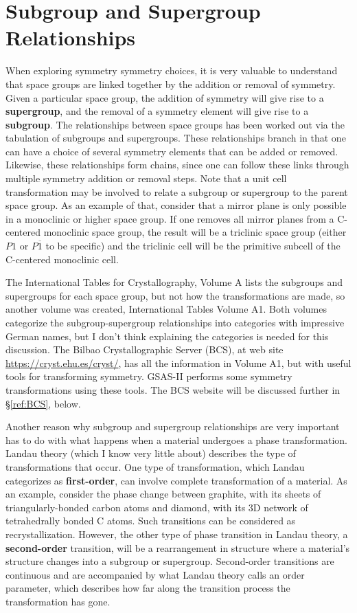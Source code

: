 \section{Subgroup and Supergroup Relationships}

When exploring symmetry symmetry choices, it is very valuable to understand that space groups are linked together by the addition or removal of symmetry. Given a particular space group, the addition of symmetry will give rise to a \textbf{supergroup}, and the removal of a symmetry element will give rise to a \textbf{subgroup}. The relationships between space groups has been worked out via the tabulation of subgroups and supergroups. These relationships branch in that one can have a choice of several symmetry elements that can be added or removed. Likewise, these relationships form chains, since one can follow these links through multiple symmetry addition or removal steps. Note that a unit cell transformation may be involved to relate a subgroup or supergroup to the parent space group. As an example of that, consider that a mirror plane is only possible in a monoclinic or higher space group. If one removes all mirror planes from a C-centered monoclinic space group, the result will be a triclinic space group (either $P 1$ or $P \overline{1}$ to be specific) and the triclinic cell will be the primitive subcell of the C-centered monoclinic cell. 

The International Tables for Crystallography, Volume A lists the subgroups and supergroups for each space group, but not how the transformations are made, so another volume was created, International Tables Volume A1. Both volumes categorize the subgroup-supergroup relationships into categories with impressive German names, but I don't think explaining the categories is needed for this discussion. The Bilbao Crystallographic Server (BCS), at web site \url{https://cryst.ehu.es/cryst/}, has all the information in Volume A1, but with useful tools for transforming symmetry. GSAS-II performs some symmetry transformations using these tools. The BCS website will be discussed further in \S\ref{ref:BCS}, below. 

Another reason why subgroup and supergroup relationships are very important has to do with what happens when a material undergoes a phase transformation. Landau theory (which I know very little about) describes the type of transformations that occur. One type of transformation, which Landau categorizes as \textbf{first-order}, can involve complete transformation of a material. As an example, consider the phase change between graphite, with its sheets of triangularly-bonded carbon atoms and diamond, with its 3D network of tetrahedrally bonded C atoms. Such transitions can be considered as recrystallization. However, the other type of phase transition in Landau theory, a \textbf{second-order} transition, will be a rearrangement in structure where a material's structure changes into a subgroup or supergroup. Second-order transitions are continuous and are accompanied by what Landau theory calls an order parameter, which describes how far along the transition process the transformation has gone. 

